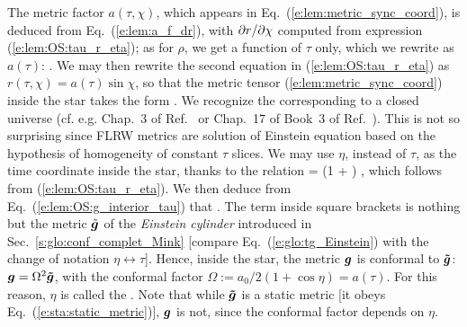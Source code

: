 The metric factor $a(\tau,\chi)$, which appears in Eq.~(\ref{e:lem:metric_sync_coord}),
is deduced from Eq.~(\ref{e:lem:a_f_dr}), with ${\partial r}/{\partial \chi}$ computed
from expression (\ref{e:lem:OS:tau_r_eta}); as for $\rho$, we get a function of $\tau$
only, which we rewrite as $a(\tau)$:
\be \label{e:lem:OS:a_tau}
   .
\ee
We may then rewrite the second equation in (\ref{e:lem:OS:tau_r_eta}) as
$r(\tau,\chi) = a(\tau) \sin\chi$, so that the metric
tensor (\ref{e:lem:metric_sync_coord}) inside the star takes the form
\be \label{e:lem:OS:g_interior_tau}
   .
\ee
We recognize the  corresponding to a closed universe
(cf. e.g. Chap.~3 of Ref.~\cite{PeterU09} or Chap.~17 of Book~3 of Ref.~\cite{DerueU18}).
This is not so surprising since FLRW metrics are solution of Einstein equation based on the hypothesis of homogeneity of constant $\tau$ slices.
We may use $\eta$, instead of $\tau$, as the time coordinate inside the star, thanks to the
relation
\be
    \dd\tau =  (1 + \cos\eta) \dd\eta ,
\ee
which follows from (\ref{e:lem:OS:tau_r_eta}). We then deduce from Eq.~(\ref{e:lem:OS:g_interior_tau})
that
\be \label{e:lem:OS:g_int}
     .
\ee
The term inside square brackets is nothing but the metric $\tilde{\bm{g}}$ of the
\emph{Einstein cylinder} introduced in Sec.~\ref{s:glo:conf_complet_Mink}
[compare Eq.~(\ref{e:glo:tg_Einstein}) with the change of notation $\eta \leftrightarrow \tau$].
Hence, inside the star, the metric $\bm{g}$ is conformal to $\bm{\tilde{g}}$:
$\bm{g} = \Omega^2 \bm{\tilde{g}}$,
with the conformal factor $\Omega := a_0/2 (1 + \cos\eta) = a(\tau)$.
For this reason, $\eta$ is called the .
Note that while $\bm{\tilde{g}}$
is a static metric [it obeys Eq.~(\ref{e:sta:static_metric})], $\bm{g}$ is not, since
the conformal factor depends on $\eta$.

